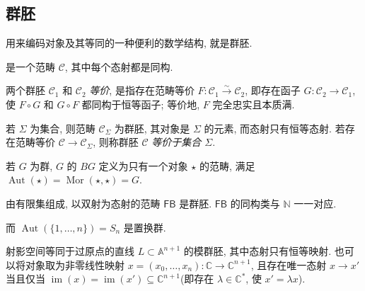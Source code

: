 \subsection{群胚}\label{src:1.4.1-subsection}
用来编码对象及其等同的一种便利的数学结构, 就是群胚.
\begin{definition}\label{src:1.4.1}
是一个范畴 $\mathcal C$, 其中每个态射都是同构.
\end{definition}
两个群胚 $\mathcal C_1$ 和 $\mathcal C_2$ \textit{等价}, 是指存在范畴等价 $F:\mathcal C_1\xrightarrow{\sim}\mathcal C_2$, 即存在函子 $G:\mathcal C_2\to\mathcal C_1$, 使 $F\circ G$ 和 $G\circ F$ 都同构于恒等函子; 等价地, $F$ 完全忠实且本质满.
\begin{example}[集合是群胚]\label{src:1.4.2}
若 $\Sigma$ 为集合, 则范畴 $\mathcal C_\Sigma$ 为群胚, 其对象是 $\Sigma$ 的元素, 而态射只有恒等态射. 若存在范畴等价 $\mathcal C\to\mathcal C_\Sigma$, 则称群胚 $\mathcal C$ \textit{等价于集合 $\Sigma$}.
\end{example}
\begin{example}[分类群胚]\label{src:1.4.3}
若 $G$ 为群, $G$ 的 $BG$ 定义为只有一个对象 $\star$ 的范畴, 满足 $\operatorname{Aut}(\star)=\operatorname{Mor}(\star,\star)=G$.
\end{example}
\begin{example}\label{src:1.4.4}
由有限集组成, 以双射为态射的范畴 $\mathsf{FB}$ 是群胚. $\mathsf{FB}$ 的同构类与 $\mathbb N$ 一一对应.

而 $\operatorname{Aut}(\{1,\ldots,n\})=S_n$ 是置换群.
\end{example}
\begin{example}[射影空间]\label{src:1.4.5}
射影空间等同于过原点的直线 $L\subset\mathbb A^{n+1}$ 的模群胚, 其中态射只有恒等映射. 也可以将对象取为非零线性映射 $x=(x_0,\ldots,x_n):\mathbb C\to\mathbb C^{n+1}$, 且存在唯一态射 $x\to x'$ 当且仅当 $\operatorname{im}(x)=\operatorname{im}(x')\subseteq\mathbb C^{n+1}$(即存在 $\lambda\in\mathbb C^*$, 使 $x'=\lambda x$).
\end{example}

